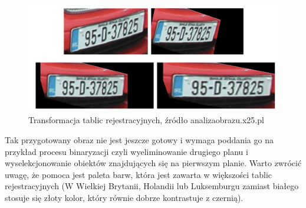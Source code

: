 \documentclass{article}
\begin{document}
	\begin{figure}
		\centering
		\includegraphics[width=15cm]{plates}
		\caption{Transformacja tablic rejestracyjnych, źródło analizaobrazu.x25.pl}
	\end{figure}
	\par
	Tak przygotowany obraz nie jest jeszcze gotowy i wymaga poddania go na przykład procesu binaryzacji czyli wyeliminowanie drugiego planu i wyselekcjonowanie obiektów znajdujących się na pierwszym planie. Warto zwrócić uwagę, że pomoca jest paleta barw, która jest zawarta w większości tablic rejestracyjnych (W Wielkiej Brytanii, Holandii lub Luksemburgu zamiast białego stosuje się złoty kolor, który równie dobrze kontrastuje z czernią).
\end{document}
